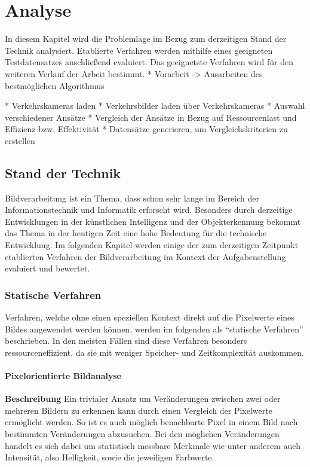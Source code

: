 \chapter{Analyse}
In diesem Kapitel wird die Problemlage im Bezug zum derzeitigen Stand der Technik analysiert.
Etablierte Verfahren werden mithilfe eines geeigneten Testdatensatzes anschließend evaluiert.
Das geeignetste Verfahren wird für den weiteren Verlauf der Arbeit bestimmt.
* Vorarbeit -> Ausarbeiten des bestmöglichen Algorithmus\newline

* Verkehrskameras laden\newline
* Verkehrsbilder laden über Verkehrskameras\newline
* Auswahl verschiedener Ansätze\newline
* Vergleich der Ansätze in Bezug auf Ressourcenlast und Effizienz bzw. Effektivität\newline
* Datensätze generieren, um Vergleichskriterien zu erstellen\newline

\section{Stand der Technik}
Bildverarbeitung ist ein Thema, dass schon sehr lange im Bereich der Informationstechnik und Informatik erforscht wird.
Besonders durch derzeitige Entwicklungen in der künstlichen Intelligenz und der Objekterkennung bekommt das Thema in der heutigen Zeit eine hohe Bedeutung für die technische Entwicklung. Im folgenden Kapitel werden einige der zum derzeitigen Zeitpunkt etablierten Verfahren der Bildverarbeitung im Kontext der Aufgabenstellung evaluiert und bewertet.

\subsection{Statische Verfahren}
Verfahren, welche ohne einen speziellen Kontext direkt auf die Pixelwerte eines Bildes angewendet werden können, werden im folgenden als "`statische Verfahren"' beschrieben. In den meisten Fällen sind diese Verfahren besonders ressourceneffizient, da sie mit weniger Speicher- und Zeitkomplexität auskommen.
\subsubsection{Pixelorientierte Bildanalyse}
\textbf{Beschreibung}\newline
Ein trivialer Ansatz um Veränderungen zwischen zwei oder mehreren Bildern zu erkennen kann durch einen Vergleich der Pixelwerte ermöglicht werden.
So ist es auch möglich benachbarte Pixel in einem Bild nach bestimmten Veränderungen abzusuchen.
Bei den möglichen Veränderungen handelt es sich dabei um statistisch messbare Merkmale wie unter anderem auch Intensität, also Helligkeit, sowie die jeweiligen Farbwerte.

